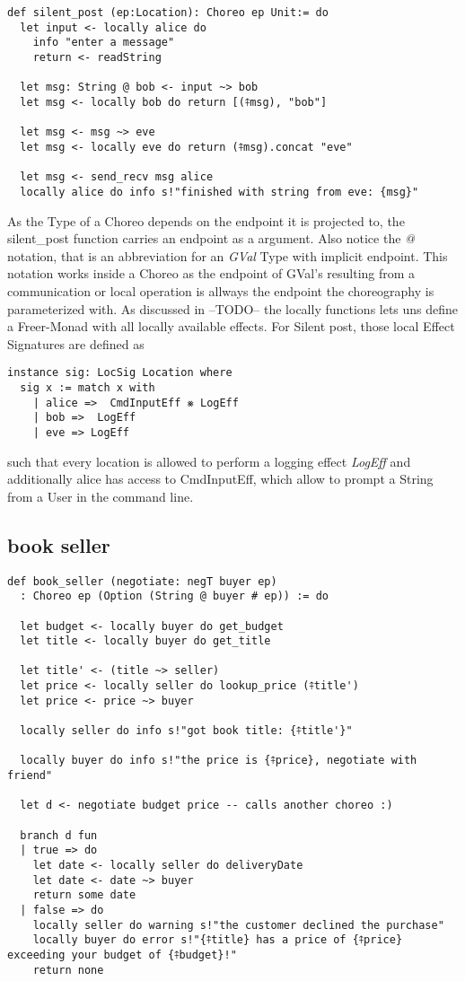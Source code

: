 \begin{lstlisting}[language=lean]
def silent_post (ep:Location): Choreo ep Unit:= do
  let input <- locally alice do
    info "enter a message"
    return <- readString

  let msg: String @ bob <- input ~> bob
  let msg <- locally bob do return [(⤉msg), "bob"]

  let msg <- msg ~> eve
  let msg <- locally eve do return (⤉msg).concat "eve"

  let msg <- send_recv msg alice
  locally alice do info s!"finished with string from eve: {msg}"
\end{lstlisting}
As the Type of a Choreo depends on the endpoint it is projected to, the silent_post function carries an endpoint as a argument. Also notice the \emph{@} notation, that is an abbreviation for an \emph{GVal} Type with implicit endpoint. This notation works inside a Choreo as the endpoint of GVal's resulting from a communication or local operation is allways the endpoint the choreography is parameterized with.
As discussed in --TODO-- the locally functions lets uns define a Freer-Monad with all locally available effects. For Silent post, those local Effect Signatures are defined as
\begin{lstlisting}[language=lean]
instance sig: LocSig Location where
  sig x := match x with
    | alice =>  CmdInputEff ⨳ LogEff
    | bob =>  LogEff
    | eve => LogEff
\end{lstlisting}
such that every location is allowed to perform a logging effect \emph{LogEff} and additionally alice has access to CmdInputEff, which allow to prompt a String from a User in the command line.


\subsection{book seller}
\label{ss:book}

\begin{lstlisting}[language=lean]
def book_seller (negotiate: negT buyer ep)
  : Choreo ep (Option (String @ buyer # ep)) := do

  let budget <- locally buyer do get_budget
  let title <- locally buyer do get_title

  let title' <- (title ~> seller)
  let price <- locally seller do lookup_price (⤉title')
  let price <- price ~> buyer

  locally seller do info s!"got book title: {⤉title'}"

  locally buyer do info s!"the price is {⤉price}, negotiate with friend"

  let d <- negotiate budget price -- calls another choreo :)

  branch d fun
  | true => do
    let date <- locally seller do deliveryDate
    let date <- date ~> buyer
    return some date
  | false => do
    locally seller do warning s!"the customer declined the purchase"
    locally buyer do error s!"{⤉title} has a price of {⤉price} exceeding your budget of {⤉budget}!"
    return none

\end{lstlisting}

